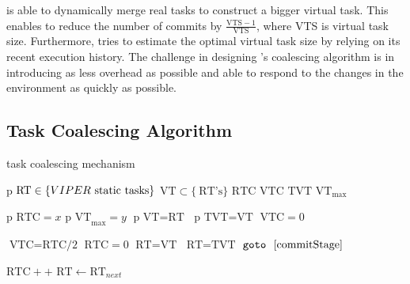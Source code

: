 \sys is able to dynamically merge real tasks to construct a bigger virtual task. This enables \sys to reduce the number of commits by $\frac{\text{VTS}-1}{\text{VTS}}$, where VTS is virtual task size. Furthermore, \sys tries to estimate the optimal virtual task size by relying on its recent execution history. The challenge in designing \sys's coalescing algorithm is in introducing as less overhead as possible and able to respond to the changes in the environment as quickly as possible. 

\subsection{Task Coalescing Algorithm}

\begin{algorithm}[t]
	\caption{\sys task coalescing mechanism}
	\label{algo:coalescing}
	\scriptsize
	\begin{algorithmic}[1]
		\State $\text{p}$  
		\State $\text{RT} \in \{VIPER~\text{static tasks}\}$  
		\State $\text{VT} \subset \{~\text{RT's}\}$  
		\State $\text{RTC}$  
		\State $\text{VTC}$  
		\State $\text{TVT}$ 
		\State $\text{VT}_{\max}$ 
		\vspace{0.1cm}
		
		\State $\text{p RTC} = x $ 
		\State $\text{p VT}_{\max} = y$
		\State $\text{p VT} = \text{RT}$ 
		\State $\text{p TVT} = \text{VT} $ 
		\State $\text{VTC} = 0 $ 
		\vspace{0.1cm}


			\State $\text{VTC} = \text{RTC/2} $  \label{algo:coalescing:executionHistory1}
			\State $\text{RTC} = 0 $
			\State $\text{RT} = \text{VT}$  \label{algo:coalescing:virtualProgressing1}
				\State $\text{RT}=\text{TVT}$
				\State $\texttt{goto} \ \ \ref{commitStage}$ \label{algo:coalescing:firmTransition1}
			\EndIf
			\vspace{0.1cm}

					\EndFunction
						\State $\text{RTC}++$  \label{algo:coalescing:realTaskCounter}
					\EndIf
					\State $\text{RT} \leftarrow \text{RT}_{next}$ 
				\EndWhile        \label{algo:coalescing:virtualProgressing2}


\end{algorithmic}
\end{algorithm}
